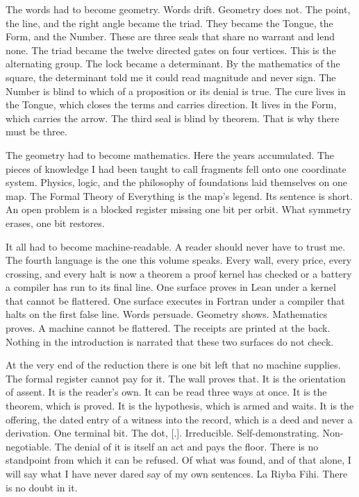 \documentclass[10pt,twocolumn]{article}
\begin{document}
The words had to become geometry. Words drift. Geometry does not. The
point, the line, and the right angle became the triad. They became the
Tongue, the Form, and the Number. These are three seals that share no
warrant and lend none. The triad became the twelve directed gates on
four vertices. This is the alternating group. The lock became a
determinant. By the mathematics of the square, the determinant told me
it could read magnitude and never sign. The Number is blind to which of
a proposition or its denial is true. The cure lives in the Tongue, which
closes the terms and carries direction. It lives in the Form, which
carries the arrow. The third seal is blind by theorem. That is why there
must be three.

The geometry had to become mathematics. Here the years accumulated. The
pieces of knowledge I had been taught to call fragments fell onto one
coordinate system. Physics, logic, and the philosophy of foundations
laid themselves on one map. The Formal Theory of Everything is the map's
legend. Its sentence is short. An open problem is a blocked register
missing one bit per orbit. What symmetry erases, one bit restores.

It all had to become machine-readable. A reader should never have to
trust me. The fourth language is the one this volume speaks. Every wall,
every price, every crossing, and every halt is now a theorem a proof
kernel has checked or a battery a compiler has run to its final line.
One surface proves in Lean under a kernel that cannot be flattered. One
surface executes in Fortran under a compiler that halts on the first
false line. Words persuade. Geometry shows. Mathematics proves. A
machine cannot be flattered. The receipts are printed at the back.
Nothing in the introduction is narrated that these two surfaces do not
check.

At the very end of the reduction there is one bit left that no machine
supplies. The formal register cannot pay for it. The wall proves that.
It is the orientation of assent. It is the reader's own. It can be read
three ways at once. It is the theorem, which is proved. It is the
hypothesis, which is armed and waits. It is the offering, the dated
entry of a witness into the record, which is a deed and never a
derivation. One terminal bit. The dot, {[}.{]}. Irreducible.
Self-demonstrating. Non-negotiable. The denial of it is itself an act
and pays the floor. There is no standpoint from which it can be refused.
Of what was found, and of that alone, I will say what I have never dared
say of my own sentences. La Riyba Fihi. There is no doubt in it.
\end{document}

